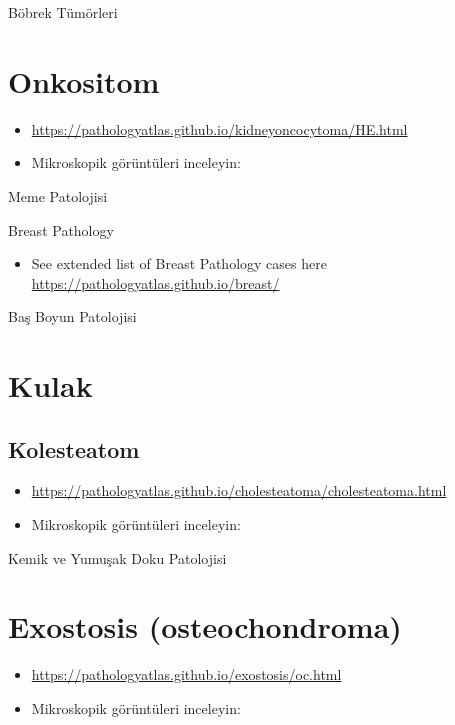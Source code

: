 \documentclass[
  letterpaper,
  DIV=11,
  numbers=noendperiod]{scrreprt}
\providecommand{\tightlist}{%
  \setlength{\itemsep}{0pt}\setlength{\parskip}{0pt}}
\begin{document}
Böbrek Tümörleri

\hypertarget{onkositom}{%
\chapter{Onkositom}\label{onkositom}}

\begin{itemize}
\item
  \url{https://pathologyatlas.github.io/kidneyoncocytoma/HE.html}
\item
  Mikroskopik görüntüleri inceleyin:
\end{itemize}

Meme Patolojisi

Breast Pathology

\begin{itemize}
\tightlist
\item
  See extended list of Breast Pathology cases here
  \url{https://pathologyatlas.github.io/breast/}
\end{itemize}

Baş Boyun Patolojisi

\hypertarget{kulak}{%
\chapter{Kulak}\label{kulak}}

\hypertarget{kolesteatom}{%
\section{Kolesteatom}\label{kolesteatom}}

\begin{itemize}
\item
  \url{https://pathologyatlas.github.io/cholesteatoma/cholesteatoma.html}
\item
  Mikroskopik görüntüleri inceleyin:
\end{itemize}

Kemik ve Yumuşak Doku Patolojisi

\hypertarget{exostosis-osteochondroma}{%
\chapter{Exostosis (osteochondroma)}\label{exostosis-osteochondroma}}

\begin{itemize}
\item
  \url{https://pathologyatlas.github.io/exostosis/oc.html}
\item
  Mikroskopik görüntüleri inceleyin:
\end{itemize}
\end{document}
